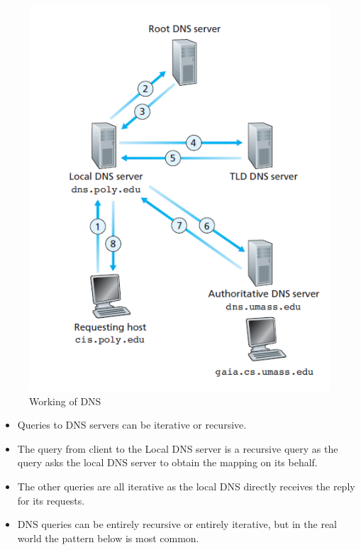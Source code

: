 \documentclass{article}
\theoremstyle{plain}
\theoremstyle{definition}
\begin{document}
\begin{figure}
    \centering
    \includegraphics[scale=0.7]{cn7.png}
    \caption{Working of DNS}
    \label{fig:my_label_7}
\end{figure}
\begin{itemize}
    \item Queries to DNS servers can be iterative or recursive.
    
    \item The query from client to the Local DNS server is a recursive query as the query asks the local DNS server to obtain the mapping on its behalf.
    
    \item The other queries are all iterative as the local DNS directly receives the reply for its requests.
    
    \item DNS queries can be entirely recursive or entirely iterative, but in the real world the pattern below is most common. 
\end{itemize}
\end{document}
